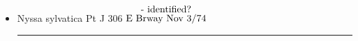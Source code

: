 \documentclass[a4paper,10pt]{article}
\begin{document}
\begin{flushleft}
\begin{itemize}
\begin{textblock*}{3.22in}
    \small
    \begin{minipage}{3.22in} 
        \color{red}
        but $\stackrel{\hbox{is}}{\hbox{$\caretinsert$}}$ not\par
        \ul{Heuchera}\par
        also called\par
         alumroot\par
        (saxifrage\par
        family)
        \normalsize
  \end{minipage}%
  \end{textblock*}%
\color{blue}
[\st{the relation to those}]
{$\stackrel{\hbox{identified*}}{\hbox{Oct 30/74}}$}\par
[*neighbor called it wild strawberry, but\par 
no berry]\par
Gray - The name of a nymph etc orig a water plant\par 
sour gum, pepperidge \color{red} (\ul{Cheyney} What Tree is That?)
\begin{textblock*}{2in}(0.8cm,23.5cm)%
    \small
    \begin{minipage}{2in} 
        \color{red}
        See\par
        Burpee\par
        \sout{???}\par
        \normalsize
  \end{minipage}%
  \end{textblock*}%
\color{blue}
\item Nyssa sylvatica Pt J 306 {$\stackrel{\hbox{- identified?}}{\hbox{E Brway Nov 3/74}}$}
\begin{adjustwidth}{-0.5in}{-0.5in}
    \rule{4.5in}{0.005in}  
\end{adjustwidth}



\end{itemize}
\end{flushleft}
\end{document}
